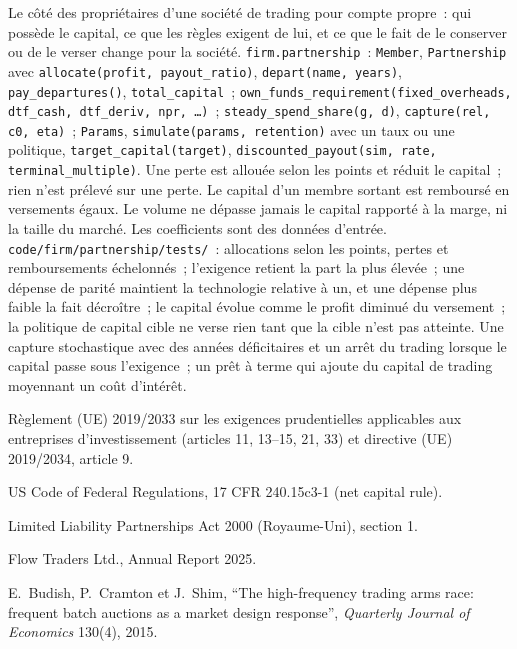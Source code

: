 \begin{build}
 Le côté des propriétaires d'une société de trading pour compte propre~: qui possède le capital, ce que les règles exigent de lui, et ce que le fait de le conserver ou de le verser
change pour la société.
 \texttt{firm.partnership}~: \texttt{Member}, \texttt{Partnership} avec \texttt{allocate(profit, payout\_ratio)},
\texttt{depart(name, years)}, \texttt{pay\_departures()}, \texttt{total\_capital}~;
\texttt{own\_funds\_requirement(fixed\_overheads, dtf\_cash, dtf\_deriv, npr, \dots)}~; \texttt{steady\_spend\_share(g, d)}, \texttt{capture(rel, c0, eta)}~; \texttt{Params},
\texttt{simulate(params, retention)} avec un taux ou une politique, \texttt{target\_capital(target)}, \texttt{discounted\_payout(sim, rate, terminal\_multiple)}.
 Une perte est allouée selon les points et réduit le capital~; rien n'est prélevé sur une perte. Le capital d'un membre sortant est remboursé en
versements égaux. Le volume ne dépasse jamais le capital rapporté à la marge, ni la taille du marché. Les coefficients sont des données d'entrée.
 \texttt{code/firm/partnership/tests/}~: allocations selon les points, pertes et remboursements échelonnés~; l'exigence retient la part la
plus élevée~; une dépense de parité maintient la technologie relative à un, et une dépense plus faible la fait décroître~; le capital évolue comme le profit diminué du versement~; la
politique de capital cible ne verse rien tant que la cible n'est pas atteinte.
 Une capture stochastique avec des années déficitaires et un arrêt du trading lorsque le capital passe sous l'exigence~; un prêt à terme qui ajoute du
capital de trading moyennant un coût d'intérêt.
\end{build}

\begin{omsources}
\item Règlement (UE) 2019/2033 sur les exigences prudentielles applicables aux entreprises d'investissement (articles 11, 13--15, 21, 33) et directive (UE) 2019/2034,
article 9.
\item US Code of Federal Regulations, 17 CFR 240.15c3-1 (net capital rule).
\item Limited Liability Partnerships Act 2000 (Royaume-Uni), section 1.
\item Flow Traders Ltd., Annual Report 2025.
\item E.~Budish, P.~Cramton et J.~Shim, ``The high-frequency trading arms race: frequent batch auctions as a market design response'',
\emph{Quarterly Journal of Economics} 130(4), 2015.
\end{omsources}

